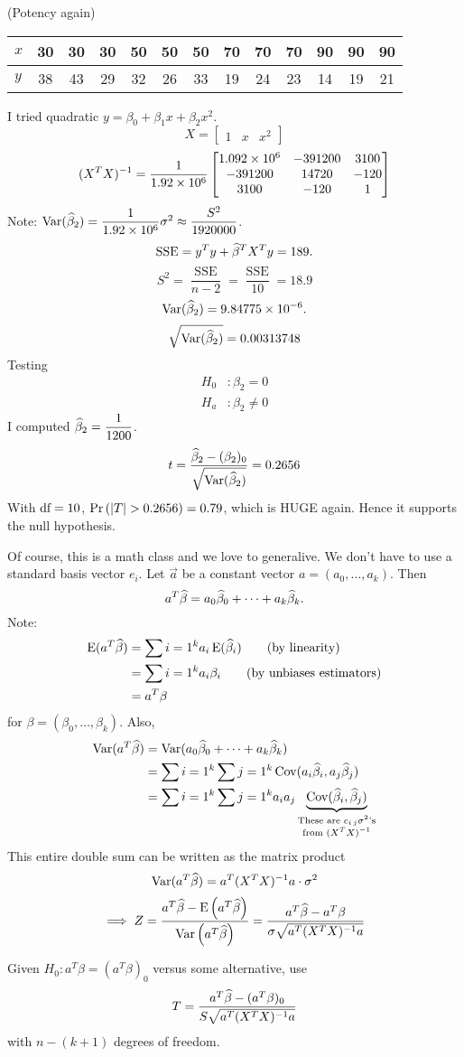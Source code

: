 \example* (Potency again)
\begin{center}
    \begin{tabular}{|l||c|c|c|c|c|c|c|c|c|c|c|c|}
         \hline
         $x$ & 30 & 30 & 30 & 50 & 50 & 50 & 70 & 70 & 70 & 90 & 90 &90 \\
         \hline
         $y$ & 38 & 43 & 29 & 32 & 26 & 33 & 19 & 24 & 23 & 14 & 19 & 21\\
         \hline
    \end{tabular}
\end{center}
I tried quadratic $y = \beta_0 + \beta_1x + \beta_2x^2$.
$$X = \begin{bmatrix}
    1 & x & x^2
\end{bmatrix}$$
$$(X^TX)^{-1} = \over{1.92 \times 10^6} \begin{bmatrix}
    1.092 \times 10^6 & -391200 & 3100\\
    -391200 & 14720 & -120\\
    3100 & -120 & 1
\end{bmatrix}$$
Note: $\Var*{\betah_2} = \over*{1.92 \times 10^6}\sigma^2 \approx \dfrac{S^2}{1920000}$.
$$\operatorname{SSE} = y^Ty + \widehat{\beta}^TX^Ty = 189.$$
$$S^2 = \frac{\operatorname{SSE}}{n-2} = \frac{\operatorname{SSE}}{10} = 18.9$$
$$\Var*{\betah_2} = 9.84775 \times 10^{-6}.$$
$$\sqrt{\Var*{\betah_2}} = 0.00313748$$
Testing
\begin{align*}
    H_0 &: \beta_2 = 0\\
    H_a &: \beta_2 \neq 0
\end{align*}
I computed $\betah_2 = \over*{1200}$.
$$t = \frac{\betah_2 - (\beta_2)_0}{\sqrt{\Var*{\betah_2}}} = 0.2656$$
With $\text{df} = 10$, $\P{\abs{T} > 0.2656} = 0.79$, which is HUGE again. Hence it supports the null hypothesis.

\nl Of course, this is a math class and we love to generalive. We don't have to use a standard basis vector $e_i$. Let $\vec{a}$ be a constant vector $a = (a_0, \dots, a_k)$. Then
$$a^T\widehat{\beta} = a_0 \widehat{\beta}_0 + \dots + a_k \widehat{\beta}_k.$$
Note:
\begin{align*}
    \E*{a^T \betah} &= \sum{i=1}^k a_i \E*{\betah_i} \tag{by linearity}\\
    &= \sum{i=1}^k a_i \beta_i \tag{by unbiases estimators}\\
    &= a^T \beta
\end{align*}
for $\beta = (\beta_0, \dots, \beta_k)$. Also,
\begin{align*}
    \Var*{a^T \betah} &= \Var*{a_0 \betah_0 + \cdots + a_k \betah_k}\\
    &= \sum{i=1}^k \sum{j=1}^k \Cov (a_i \betah_i, a_j \betah_j)\\
    &= \sum{i=1}^k \sum{j=1}^k a_i a_j \underbrace{\Cov (\betah_i, \betah_j)}_{\substack{\text{These are } c_{i\,j} \sigma^2 \text{'s} \\ \text{from } (X^TX)^{-1}}}
\end{align*}
This entire double sum can be written as the matrix product
$$\Var*{a^T \betah} = a^T (X^TX)^{-1}a \cdot \sigma^2$$
$$\implies Z = \frac{a^T \betah - \E{a^T \betah}}{\Var{a^T\betah}} = \frac{a^T \betah - a^T \beta}{\sigma \sqrt{a^T (X^TX)^{-1} a} }$$

\nl Given $H_0 : a^T \beta = (a^T \beta)_0$ versus some alternative, use
$$T = \frac{a^T \widehat{\beta} - (a^T \beta)_0}{S \sqrt{a^T (X^TX)^{-1}a}}$$
with $n-(k+1)$ degrees of freedom. 